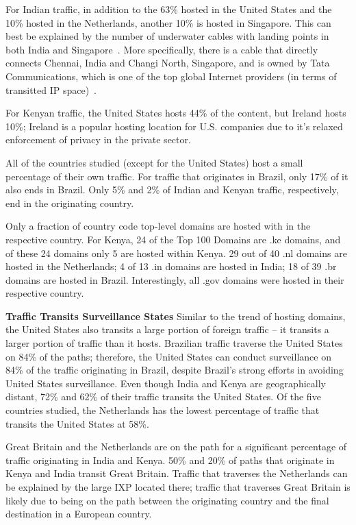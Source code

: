 For Indian traffic, in addition to the 63\% hosted in the United States and the 10\% hosted in the Netherlands, another 10\% is hosted in Singapore.  This can best be explained by the number of underwater cables with landing points in both India and Singapore~\cite{cablemap}.  More specifically, there is a cable that directly connects Chennai, India and Changi North, Singapore, and is owned by Tata Communications, which is one of the top global Internet providers (in terms of transitted IP space)~\cite{bakers}.  

For Kenyan traffic, the United States hosts 44\% of the content, but Ireland hosts 10\%; Ireland is a popular hosting location for U.S. companies due to it's relaxed enforcement of privacy in the private sector.  

All of the countries studied (except for the United States) host a small percentage of their own traffic.  For traffic that originates in Brazil, only 17\% of it also ends in Brazil.  Only 5\% and 2\% of Indian and Kenyan traffic, respectively, end in the originating country.  

Only a fraction of country code top-level domains are hosted with in the respective country.  For Kenya, 24 of the Top 100 Domains are .ke domains, and of these 24 domains only 5 are hosted within Kenya.  29 out of 40 .nl domains are hosted in the Netherlands; 4 of 13 .in domains are hosted in India; 18 of 39 .br domains are hosted in Brazil.  Interestingly, all .gov domains were hosted in their respective country.

{\bf Traffic Transits Surveillance States}
Similar to the trend of hosting domains, the United States also transits a large portion of foreign traffic -- it transits a larger portion of traffic than it hosts.  Brazilian traffic traverse the United States on 84\% of the paths; therefore, the United States can conduct surveillance on 84\% of the traffic originating in Brazil, despite Brazil's strong efforts in avoiding United States surveillance.  Even though India and Kenya are geographically distant, 72\% and 62\% of their traffic transits the United States.  Of the five countries studied, the Netherlands has the lowest percentage of traffic that transits the United States at 58\%.  

Great Britain and the Netherlands are on the path for a significant percentage of traffic originating in India and Kenya.  50\% and 20\% of paths that originate in Kenya and India transit Great Britain.  Traffic that traverses the Netherlands can be explained by the large IXP located there; traffic that traverses Great Britain is likely due to being on the path between the originating country and the final destination in a European country.

